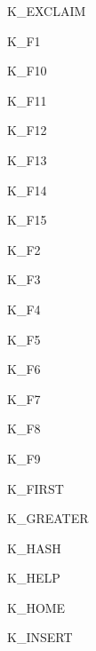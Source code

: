 \begin{datadesc}{K_EXCLAIM}
\end{datadesc}
\begin{datadesc}{K_F1}
\end{datadesc}
\begin{datadesc}{K_F10}
\end{datadesc}
\begin{datadesc}{K_F11}
\end{datadesc}
\begin{datadesc}{K_F12}
\end{datadesc}
\begin{datadesc}{K_F13}
\end{datadesc}
\begin{datadesc}{K_F14}
\end{datadesc}
\begin{datadesc}{K_F15}
\end{datadesc}
\begin{datadesc}{K_F2}
\end{datadesc}
\begin{datadesc}{K_F3}
\end{datadesc}
\begin{datadesc}{K_F4}
\end{datadesc}
\begin{datadesc}{K_F5}
\end{datadesc}
\begin{datadesc}{K_F6}
\end{datadesc}
\begin{datadesc}{K_F7}
\end{datadesc}
\begin{datadesc}{K_F8}
\end{datadesc}
\begin{datadesc}{K_F9}
\end{datadesc}
\begin{datadesc}{K_FIRST}
\end{datadesc}
\begin{datadesc}{K_GREATER}
\end{datadesc}
\begin{datadesc}{K_HASH}
\end{datadesc}
\begin{datadesc}{K_HELP}
\end{datadesc}
\begin{datadesc}{K_HOME}
\end{datadesc}
\begin{datadesc}{K_INSERT}
\end{datadesc}

